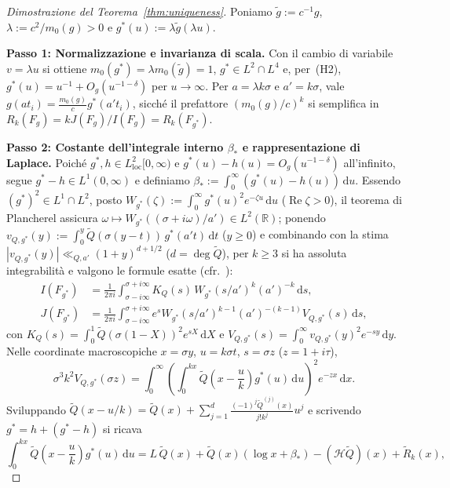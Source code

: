 \documentclass[11pt, reqno]{amsart}
\theoremstyle{remark}
\numberwithin{equation}{section}
\DeclareMathOperator{\re}{Re}
\newcommand{\R}{\mathbb{R}}
\newcommand{\cH}{\mathcal{H}}
\newcommand{\dd}{\,\mathrm{d}}
\begin{document}
\begin{proof}[Dimostrazione del Teorema~\ref{thm:uniqueness}]
Poniamo $\tilde{g} := c^{-1} g$, $\lambda := c^2 / m_0(g) > 0$ e $g^*(u) := \lambda \tilde{g}(\lambda u)$.

\smallskip
\noindent\textbf{Passo 1: Normalizzazione e invarianza di scala.}
Con il cambio di variabile $v = \lambda u$ si ottiene $m_0(g^*) = \lambda m_0(\tilde{g}) = 1$,
$g^* \in L^2 \cap L^4$ e, per~(H2), $g^*(u) = u^{-1} + O_g(u^{-1-\delta})$ per $u \to \infty$.
Per $a = \lambda k\sigma$ e $a' = k\sigma$, vale $g(a t_i) = \frac{m_0(g)}{c} g^*(a' t_i)$, sicché
il prefattore $(m_0(g)/c)^k$ si semplifica in $R_k(F_g) = k J(F_g)/I(F_g) = R_k(F_{g^*})$.

\smallskip
\noindent\textbf{Passo 2: Costante dell'integrale interno $\beta_*$ e rappresentazione di Laplace.}
Poiché $g^*, h \in L^2_{\mathrm{loc}}[0,\infty)$ e $g^*(u) - h(u) = O_g(u^{-1-\delta})$ all'infinito,
segue $g^* - h \in L^1(0,\infty)$ e definiamo $\beta_* := \int_0^\infty (g^*(u) - h(u))\dd u$.
Essendo $(g^*)^2 \in L^1 \cap L^2$, posto $W_{g^*}(\zeta) := \int_0^\infty g^*(u)^2 e^{-\zeta u}\dd u$
($\re\zeta > 0$), il teorema di Plancherel assicura $\omega \mapsto W_{g^*}((\sigma+i\omega)/a') \in L^2(\R)$;
ponendo $v_{Q, g^*}(y) := \int_0^y \widetilde{Q}(\sigma(y-t))\, g^*(a' t)\dd t$ ($y \ge 0$) e
combinando con la stima $|v_{Q, g^*}(y)| \ll_{Q, a'} (1+y)^{d+1/2}$ ($d = \deg\widetilde{Q}$), per $k \ge 3$ si ha
assoluta integrabilità e valgono le formule esatte (cfr.\ \cite[Teorema~4]{Lewulis}):
\begin{align*}
I(F_{g^*}) &= \frac{1}{2\pi i}\int_{\sigma-i\infty}^{\sigma+i\infty} K_Q(s)\, W_{g^*}(s/a')^k (a')^{-k}\dd s, \\
J(F_{g^*}) &= \frac{1}{2\pi i}\int_{\sigma-i\infty}^{\sigma+i\infty} e^s W_{g^*}(s/a')^{k-1}(a')^{-(k-1)} V_{Q,g^*}(s)\dd s,
\end{align*}
con $K_Q(s) = \int_0^1 \widetilde{Q}(\sigma(1-X))^2 e^{sX}\dd X$ e
$V_{Q,g^*}(s) = \int_0^\infty v_{Q,g^*}(y)^2 e^{-sy}\dd y$.
Nelle coordinate macroscopiche $x = \sigma y$, $u = k\sigma t$, $s = \sigma z$ ($z = 1+i\tau$),
\[
\sigma^3 k^2 V_{Q, g^*}(\sigma z)
= \int_0^\infty \left(\int_0^{kx} \widetilde{Q}\!\left(x - \frac{u}{k}\right) g^*(u)\dd u\right)^{\!2} e^{-zx}\dd x.
\]
Sviluppando $\widetilde{Q}(x-u/k) = \widetilde{Q}(x) + \sum_{j=1}^d \frac{(-1)^j \widetilde{Q}^{(j)}(x)}{j! k^j} u^j$
e scrivendo $g^* = h + (g^* - h)$ si ricava
\[
\int_0^{kx} \widetilde{Q}\!\left(x - \frac{u}{k}\right) g^*(u)\dd u
= L\,\widetilde{Q}(x) + \widetilde{Q}(x)(\log x + \beta_*) - (\cH\widetilde{Q})(x) + \widetilde{R}_k(x),
\]
\end{proof}
\end{document}
